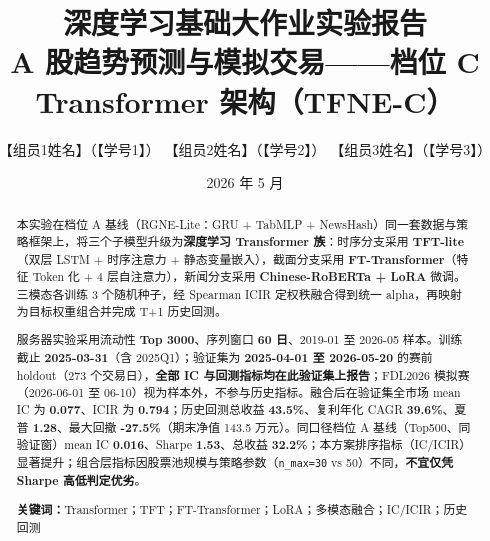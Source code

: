 \documentclass[UTF8,a4paper,12pt]{ctexart}
\title{\textbf{深度学习基础大作业实验报告}\\[0.4em]
\large A 股趋势预测与模拟交易——档位 C Transformer 架构（TFNE-C）}
\author{
  【组员1姓名】（【学号1】）\quad
  【组员2姓名】（【学号2】）\quad
  【组员3姓名】（【学号3】）
}
\date{2026 年 5 月}
\begin{document}
\maketitle
\thispagestyle{empty}

\begin{center}
\end{center}

\begin{abstract}
本实验在档位 A 基线（RGNE-Lite：GRU + TabMLP + NewsHash）同一套数据与策略框架上，将三个子模型升级为\textbf{深度学习 Transformer 族}：时序分支采用 \textbf{TFT-lite}（双层 LSTM + 时序注意力 + 静态变量嵌入），截面分支采用 \textbf{FT-Transformer}（特征 Token 化 + 4 层自注意力），新闻分支采用 \textbf{Chinese-RoBERTa + LoRA} 微调。三模态各训练 3 个随机种子，经 Spearman ICIR 定权秩融合得到统一 alpha，再映射为目标权重组合并完成 T+1 历史回测。

服务器实验采用流动性 \textbf{Top 3000}、序列窗口 \textbf{60 日}、2019-01 至 2026-05 样本。训练截止 \textbf{2025-03-31}（含 2025Q1）；验证集为 \textbf{2025-04-01 至 2026-05-20} 的赛前 holdout（273 个交易日），\textbf{全部 IC 与回测指标均在此验证集上报告}；FDL2026 模拟赛（2026-06-01 至 06-10）视为样本外，不参与历史指标。融合后在验证集全市场 mean IC 为 \textbf{0.077}、ICIR 为 \textbf{0.794}；历史回测总收益 \textbf{43.5\%}、复利年化 CAGR \textbf{39.6\%}、夏普 \textbf{1.28}、最大回撤 \textbf{-27.5\%}（期末净值 143.5 万元）。同口径档位 A 基线（Top500、同验证窗）mean IC \textbf{0.016}、Sharpe \textbf{1.53}、总收益 \textbf{32.2\%}；本方案排序指标（IC/ICIR）显著提升；组合层指标因股票池规模与策略参数（\texttt{n\_max=30} vs 50）不同，\textbf{不宜仅凭 Sharpe 高低判定优劣}。

\vspace{0.5em}
\noindent\textbf{关键词：}Transformer；TFT；FT-Transformer；LoRA；多模态融合；IC/ICIR；历史回测
\end{abstract}
\end{document}
